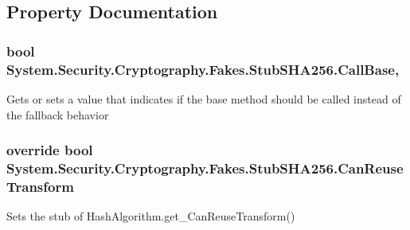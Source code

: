 \subsection{Property Documentation}
\hypertarget{class_system_1_1_security_1_1_cryptography_1_1_fakes_1_1_stub_s_h_a256_a1d89c6e21471d2907a0e14edefcf4e41}{
\subsubsection[{Call\-Base}]{\setlength{\rightskip}{0pt plus 5cm}bool System.\-Security.\-Cryptography.\-Fakes.\-Stub\-S\-H\-A256.\-Call\-Base\hspace{0.3cm}{\ttfamily [get]}, {\ttfamily [set]}}}\label{class_system_1_1_security_1_1_cryptography_1_1_fakes_1_1_stub_s_h_a256_a1d89c6e21471d2907a0e14edefcf4e41}


Gets or sets a value that indicates if the base method should be called instead of the fallback behavior

\hypertarget{class_system_1_1_security_1_1_cryptography_1_1_fakes_1_1_stub_s_h_a256_aa122c9d715fa5c4eb585271ceb657d3f}{
\subsubsection[{Can\-Reuse\-Transform}]{\setlength{\rightskip}{0pt plus 5cm}override bool System.\-Security.\-Cryptography.\-Fakes.\-Stub\-S\-H\-A256.\-Can\-Reuse\-Transform\hspace{0.3cm}{\ttfamily [get]}}}\label{class_system_1_1_security_1_1_cryptography_1_1_fakes_1_1_stub_s_h_a256_aa122c9d715fa5c4eb585271ceb657d3f}


Sets the stub of Hash\-Algorithm.\-get\-\_\-\-Can\-Reuse\-Transform()

